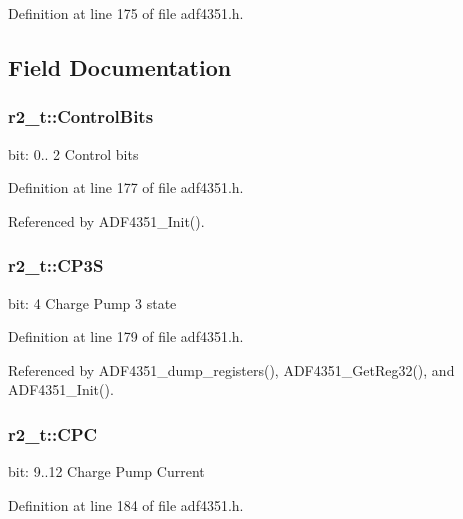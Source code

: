 Definition at line 175 of file adf4351.\+h.



\subsection{Field Documentation}
\subsubsection[{\texorpdfstring{Control\+Bits}{ControlBits}}]{ r2\+\_\+t\+::\+Control\+Bits}\hypertarget{structr2__t_a3afba2088cc33e95e833436e6a111a6a}{}\label{structr2__t_a3afba2088cc33e95e833436e6a111a6a}
bit\+: 0.. 2 Control bits 

Definition at line 177 of file adf4351.\+h.



Referenced by A\+D\+F4351\+\_\+\+Init().

\subsubsection[{\texorpdfstring{C\+P3S}{CP3S}}]{ r2\+\_\+t\+::\+C\+P3S}\hypertarget{structr2__t_a378d00b9682aa05bffb1a3e61da036e4}{}\label{structr2__t_a378d00b9682aa05bffb1a3e61da036e4}
bit\+: 4 Charge Pump 3 state 

Definition at line 179 of file adf4351.\+h.



Referenced by A\+D\+F4351\+\_\+dump\+\_\+registers(), A\+D\+F4351\+\_\+\+Get\+Reg32(), and A\+D\+F4351\+\_\+\+Init().

\subsubsection[{\texorpdfstring{C\+PC}{CPC}}]{ r2\+\_\+t\+::\+C\+PC}\hypertarget{structr2__t_a71530b2c7c16577560cd14f14f320572}{}\label{structr2__t_a71530b2c7c16577560cd14f14f320572}
bit\+: 9..12 Charge Pump Current 

Definition at line 184 of file adf4351.\+h.




